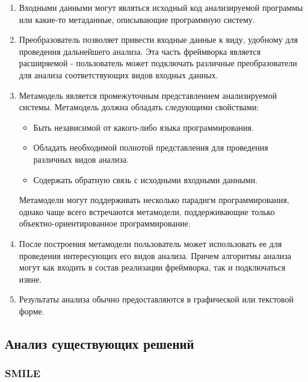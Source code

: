 \begin{enumerate}

    \item Входными данными могут являться исходный код анализируемой программы
    или какие-то метаданные, описывающие программную систему.

    \item Преобразователь позволяет привести входные данные к виду, удобному для
    проведения дальнейшего анализа. Эта часть фреймворка является расширяемой -
    пользователь может подключать различные преобразователи для анализа
    соответствующих видов входных данных.

    \item Метамодель является промежуточным представлением анализируемой системы.
    Метамодель должна обладать следующими свойствами:

    \begin{itemize}
        \item Быть независимой от какого-либо языка программирования.
        \item Обладать необходимой полнотой представления для проведения
        различных видов анализа.
        \item Содержать обратную связь с исходными входными данными.
    \end{itemize}

    Метамодели могут поддерживать несколько парадигм программирования,
    однако чаще всего встречаются метамодели, поддерживающие
    только объектно-ориентированное программирование.

    \item После построения метамодели пользователь может использовать ее для
    проведения интересующих его видов анализа. Причем алгоритмы анализа могут
    как входить в состав реализации фреймворка, так и подключаться извне.

    \item Результаты анализа обычно предоставляются в графической или текстовой
    форме.
\end{enumerate}

\subsection{Анализ существующих решений} %
\subsubsection{SMILE} %


